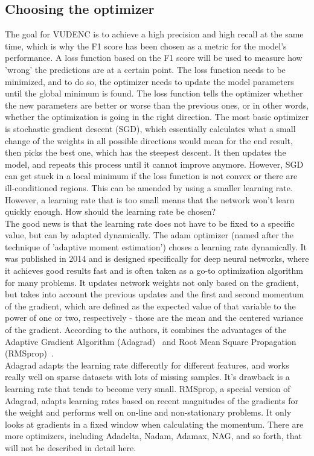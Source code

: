 \documentclass[
	a4paper,
	pagesize,
	pdftex,
	12pt,
	twoside, %
	BCOR=5mm, %
	ngerman,
	fleqn,
	final,
	]{scrartcl}
\begin{document}
\subsection{Choosing the optimizer}\label{optimizer}
The goal for VUDENC is to achieve a high precision and high recall at the same time, which is why the F1 score has been chosen as a metric for the model's performance. A loss function based on the F1 score will be used to measure how 'wrong' the predictions are at a certain point. The loss function needs to be minimized, and to do so, the optimizer needs to update the model parameters until the global minimum is found. The loss function tells the optimizer whether the new parameters are better or worse than the previous ones, or in other words, whether the optimization is going in the right direction. The most basic optimizer is stochastic gradient descent (SGD), which essentially calculates what a small change of the weights in all possible directions would mean for the end result, then picks the best one, which has the steepest descent. It then updates the model, and repeats this process until it cannot improve anymore. However, SGD can get stuck in a local minimum if the loss function is not convex or there are ill-conditioned regions. This can be amended by using a smaller learning rate. However, a learning rate that is too small means that the network won't learn quickly enough. How should the learning rate be chosen?\\
The good news is that the learning rate does not have to be fixed to a specific value, but can by adapted dynamically. The adam optimizer (named after the technique of 'adaptive moment estimation') choses a learning rate dynamically. It was published in 2014 \cite{Kingma.2014} and is designed specifically for deep neural networks, where it achieves good results fast and is often taken as a go-to optimization algorithm for many problems. It updates network weights not only based on the gradient, but takes into account the previous updates and the first and second momentum of the gradient, which are defined as the expected value of that variable to the power of one or two, respectively - those are the mean and the centered variance of the gradient. According to the authors, it combines the advantages of the Adaptive Gradient Algorithm (Adagrad)~\cite{Duchi.2011} and Root Mean Square Propagation (RMSprop)~\cite{Tieleman.2012}.\\
Adagrad adapts the learning rate differently for different features, and works really well on sparse datasets with lots of missing samples. It's drawback is a learning rate that tends to become very small. RMSprop, a special version of Adagrad, adapts learning rates based on recent magnitudes of the gradients for the weight and performs well on on-line and non-stationary problems. It only looks at gradients in a fixed window when calculating the momentum. There are more optimizers, including Adadelta, Nadam, Adamax, NAG, and so forth, that will not be described in detail here.\\
\end{document}
